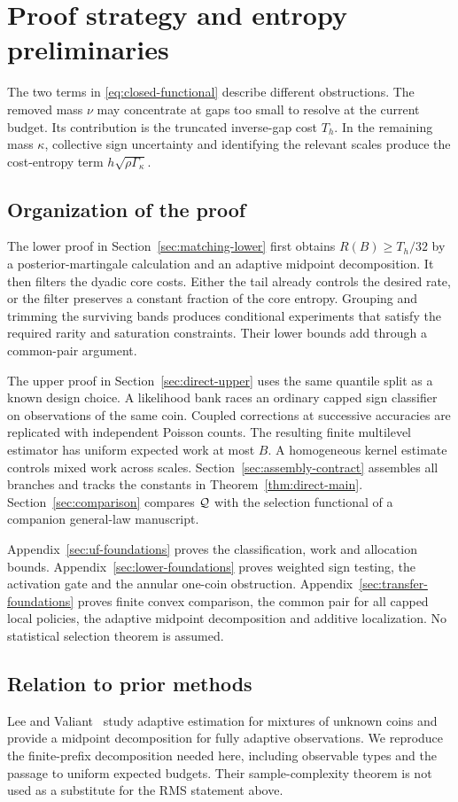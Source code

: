 \section{Proof strategy and entropy preliminaries}\label{sec:overview}
The two terms in \eqref{eq:closed-functional} describe different
obstructions. The removed mass $\nu$ may concentrate at gaps too
small to resolve at the current budget. Its contribution is the
truncated inverse-gap cost $T_h$. In the remaining mass $\kappa$,
collective sign uncertainty and identifying the relevant scales
produce the cost-entropy term $h\sqrt{\rho\Gamma_\kappa}$.

\subsection{Organization of the proof}
The lower proof in Section~\ref{sec:matching-lower} first obtains
$R(B)\ge T_h/32$ by a posterior-martingale calculation and an
adaptive midpoint decomposition. It then filters the dyadic core
costs. Either the tail already controls the desired rate, or the
filter preserves a constant fraction of the core entropy. Grouping
and trimming the surviving bands produces conditional experiments
that satisfy the required rarity and saturation constraints.
Their lower bounds add through a common-pair argument.

The upper proof in Section~\ref{sec:direct-upper} uses the same
quantile split as a known design choice. A likelihood bank races
an ordinary capped sign classifier on observations of the same
coin. Coupled corrections at successive accuracies are replicated
with independent Poisson counts. The resulting finite multilevel
estimator has uniform expected work at most $B$. A homogeneous
kernel estimate controls mixed work across scales.
Section~\ref{sec:assembly-contract} assembles all branches and
tracks the constants in Theorem~\ref{thm:direct-main}.
Section~\ref{sec:comparison} compares $\mathcal Q$ with the selection
functional of a companion general-law manuscript.

Appendix~\ref{sec:uf-foundations} proves the classification, work
and allocation bounds. Appendix~\ref{sec:lower-foundations}
proves weighted sign testing, the activation gate and the annular
one-coin obstruction. Appendix~\ref{sec:transfer-foundations}
proves finite convex comparison, the common pair for all capped
local policies, the adaptive midpoint decomposition and additive
localization. No statistical selection theorem is assumed.

\subsection{Relation to prior methods}
Lee and Valiant~\cite{lv} study adaptive estimation for mixtures
of unknown coins and provide a midpoint decomposition for
fully adaptive observations. We reproduce the finite-prefix
decomposition needed here, including observable types and the
passage to uniform expected budgets. Their sample-complexity
theorem is not used as a substitute for the RMS statement above.

